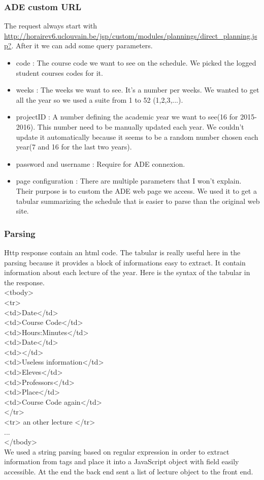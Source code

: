 \documentclass[11pt, a4paper]{report}
\newcommand\tab[1][0.5cm]{\hspace*{#1}}
\begin{document}
\subsubsection{ADE custom URL}
The request always start with \url{http://horairev6.uclouvain.be/jsp/custom/modules/plannings/direct_planning.jsp?}. After it we can add some query parameters.
\begin{itemize}
\item code : The course code we want to see on the schedule. We picked the logged student courses codes for it.
\item weeks : The weeks we want to see. It's a number per weeks. We wanted to get all the year so we used a suite from 1 to 52 (1,2,3,...).
\item projectID : A number defining the academic year we want to see(16 for 2015-2016). This number need to be manually updated each year. We couldn't update it automatically because it seems to be a random number chosen each year(7 and 16 for the last two years).
\item password and username : Require for ADE connexion.
\item page configuration : There are multiple parameters that I won't explain. Their purpose is to custom the ADE web page we access. We used it to get a tabular summarizing the schedule that is easier to parse than the original web site. 
\end{itemize}

\subsubsection{Parsing}
Http response contain an html code. The tabular is really useful here in the parsing because it provides a block of informations easy to extract. It contain information about each lecture of the year. Here is the syntax of the tabular in the response.\\
<tbody>\\
\tab <tr>\\
\tab \tab <td>Date</td>\\
\tab \tab <td>Course Code</td>\\
\tab \tab <td>Hours:Minutes</td>\\
\tab \tab <td>Date</td>\\
\tab \tab <td></td>\\
\tab \tab <td>Useless information</td>\\
\tab \tab <td>Eleves</td>\\
\tab \tab <td>Professors</td>\\
\tab \tab <td>Place</td>\\
\tab \tab <td>Course Code again</td>\\
\tab </tr>\\
\tab <tr> an other lecture </tr>\\
\tab ...\\
</tbody>\\
We used a string parsing based on regular expression in order to extract information from tags and place it into a JavaScript object with field easily accessible. At the end the back end sent a list of lecture object to the front end.
\end{document}
